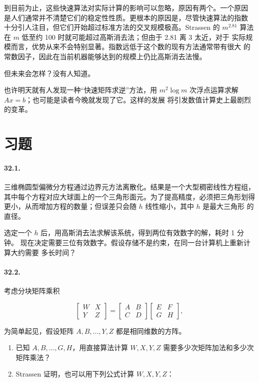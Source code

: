 \documentclass[UTF8,fontset=none,12pt]{ctexart}
\begin{document}
到目前为止，这些快速算法对实际计算的影响可以忽略，原因有两个。一个原因
是人们通常并不清楚它们的稳定性性质。更根本的原因是，尽管快速算法的指数
十分引人注目，但它们开始超过标准方法的交叉规模极高。Strassen 的 $m^{2.81}$
算法在 $m$ 低至约 100 时就可能超过高斯消去法；但由于 2.81 离 3 太近，对于
实际规模而言，优势从来不会特别显著。指数远低于这个数的现有方法通常带有很大
的常数因子，因此在当前机器能够达到的规模上仍比高斯消去法慢。

但未来会怎样？没有人知道。

也许明天就有人发现一种“快速矩阵求逆”方法，用
$m^2\log m$ 次浮点运算求解 $Ax=b$；也可能是读者今晚就发现了它。这样的发展
将引发数值计算史上最剧烈的变革。

\section*{习题}

\paragraph{32.1.}
三维椭圆型偏微分方程通过边界元方法离散化。结果是一个大型稠密线性方程组，
其中每个方程对应大球面上的一个三角形面元。为了提高精度，必须把三角形划得
更小，从而增加方程的数量；但误差只会随 $h$ 线性缩小，其中 $h$ 是最大三角形
的直径。

选定一个 $h$ 后，用高斯消去法求解该系统，得到两位有效数字的解，耗时 1 分钟。
现在决定需要三位有效数字。假设存储不是约束，在同一台计算机上重新计算大约需要
多长时间？

\paragraph{32.2.}
考虑分块矩阵乘积

\[
\begin{bmatrix}
W&X\\
Y&Z
\end{bmatrix}
=
\begin{bmatrix}
A&B\\
C&D
\end{bmatrix}
\begin{bmatrix}
E&F\\
G&H
\end{bmatrix},
\]

为简单起见，假设矩阵 $A,B,\ldots,Y,Z$ 都是相同维数的方阵。

\begin{enumerate}[label=(\alph*)]
\item 已知 $A,B,\ldots,G,H$，用直接算法计算 $W,X,Y,Z$ 需要多少次矩阵加法和多少次矩阵乘法？
\item Strassen 证明，也可以用下列公式计算 $W,X,Y,Z$：
\end{enumerate}
\end{document}
